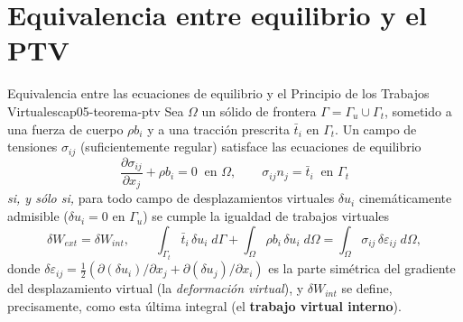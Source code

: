 \section{Equivalencia entre equilibrio y el PTV}
\label{sec:cap05-teorema-ptv}

\begin{teorema}{Equivalencia entre las ecuaciones de equilibrio y el Principio de los Trabajos Virtuales}{cap05-teorema-ptv}
Sea $\Omega$ un sólido de frontera $\Gamma=\Gamma_u\cup\Gamma_t$, sometido a una fuerza de cuerpo $\rho b_i$ y a una tracción prescrita $\bar t_i$ en $\Gamma_t$. Un campo de tensiones $\sigma_{ij}$ (suficientemente regular) satisface las ecuaciones de equilibrio
\[
\frac{\partial \sigma_{ij}}{\partial x_j} + \rho b_i = 0 \ \text{ en } \Omega, \qquad \sigma_{ij}n_j = \bar t_i \ \text{ en } \Gamma_t
\]
\emph{si, y sólo si,} para todo campo de desplazamientos virtuales $\delta u_i$ cinemáticamente admisible ($\delta u_i=0$ en $\Gamma_u$) se cumple la igualdad de trabajos virtuales
\[
\delta W_{ext} = \delta W_{int}, \qquad
\int_{\Gamma_t} \bar t_i\, \delta u_i \; d\Gamma + \int_\Omega \rho b_i\, \delta u_i \; d\Omega = \int_\Omega \sigma_{ij}\, \delta\varepsilon_{ij} \; d\Omega ,
\]
donde $\delta\varepsilon_{ij}=\tfrac12\left(\partial(\delta u_i)/\partial x_j + \partial(\delta u_j)/\partial x_i\right)$ es la parte simétrica del gradiente del desplazamiento virtual (la \emph{deformación virtual}), y $\delta W_{int}$ se define, precisamente, como esta última integral (el \textbf{trabajo virtual interno}).


\end{teorema}
